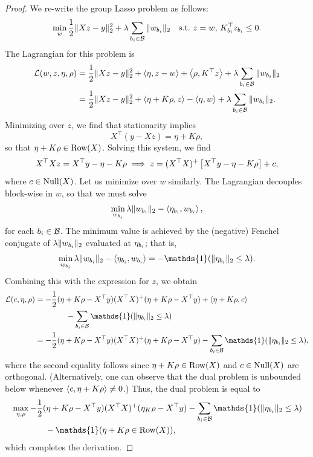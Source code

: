 \begin{proof}
    We re-write the group Lasso problem as follows:
    \begin{align*}
        \min_{w} \frac 1 2 \|X z - y\|_2^2 + \lambda \sum_{{b_i} \in \mathcal{B}} \|w_{b_i}\|_2
        \quad \text{s.t.} \, \, z = w, \, K_{{b_i}}^\top z_{b_i} \leq 0.
    \end{align*}
    The Lagrangian for this problem is
    \begin{align*}
        \mathcal{L}(w, z, \eta, \rho)
         & = \frac 1 2 \|X z - y\|_2^2 + \left\langle\eta, z - w\right\rangle + \left\langle\rho, K^\top z\right\rangle + \lambda \sum_{{b_i} \in \mathcal{B}} \|w_{b_i}\|_2 \\
         & = \frac 1 2 \|X z - y\|_2^2 + \left\langle\eta + K \rho, z\right\rangle - \left\langle\eta, w\right\rangle + \lambda \sum_{{b_i} \in \mathcal{B}} \|w_{b_i}\|_2.
    \end{align*}
    Minimizing over \( z \), we find that stationarity implies
    \[
        X^\top (y - X z) = \eta + K \rho,
    \]
    so that \( \eta + K \rho \in \text{Row}(X) \).
    Solving this system, we find
    \[
        X^\top X z = X^\top y - \eta - K \rho \implies z = (X^\top X)^+ \left[X^\top y - \eta - K \rho\right] + c,
    \]
    where \( c \in \text{Null}(X) \).
    Let us minimize over \( w \) similarly.
    The Lagrangian decouples block-wise in \( w \), so that
    we must solve
    \[
        \min_{w_{b_i}} \lambda \|w_{b_i}\|_2 - \left\langle\eta_{b_i}, w_{b_i}\right\rangle,
    \]
    for each \( {b_i} \in \mathcal{B} \).
    The minimum value is achieved by the (negative) Fenchel conjugate of
    \( \lambda \|w_{b_i}\|_2 \)
    evaluated at \( \eta_{b_i} \);
    that is,
    \[
        \min_{\wi} \lambda \norm{\wi}_2 - \abr{\eta_\bi, \wi} = - \mathds{1}(\norm{\eta_\bi}_2 \leq \lambda).
    \]
    Combining this with the expression for \( z \), we obtain
    \begin{align*}
        \calL(c, \eta, \rho)
         & = - \half (\eta + K \rho - X^\top y) (X^\top X)^+ (\eta + K \rho - X^\top y)
        + \abr{\eta + K \rho, c}
        \\
         & \hspace{4em} - \sum_{\bi \in \calB} \mathds{1}(\norm{\eta_\bi}_2 \leq \lambda) \\
         & = - \half (\eta + K \rho - X^\top y) (X^\top X)^+ (\eta + K \rho - X^\top y)
        - \sum_{\bi \in \calB} \mathds{1}(\norm{\eta_\bi}_2 \leq \lambda),
    \end{align*}
    where the second equality follows since \( \eta + K \rho \in \text{Row}(X) \) and \( c \in \text{Null}(X) \)
    are orthogonal.
    (Alternatively, one can observe that the dual problem is unbounded below
    whenever \( \left\langle c, \eta + K \rho\right\rangle \neq 0 \).)
    Thus, the dual problem is equal to
    \begin{align*}
         & \max_{\eta, \rho} - \half (\eta + K \rho - X^\top y) (X^\top X)^+ (\eta _ K \rho - X^\top y)
        - \sum_{\bi \in \calB} \mathds{1}(\norm{\eta_\bi}_2 \leq \lambda)                               \\
         & \hspace{4em} - \mathds{1}(\eta + K \rho \in \Row(X)),
    \end{align*}
    which completes the derivation.


\end{proof}
